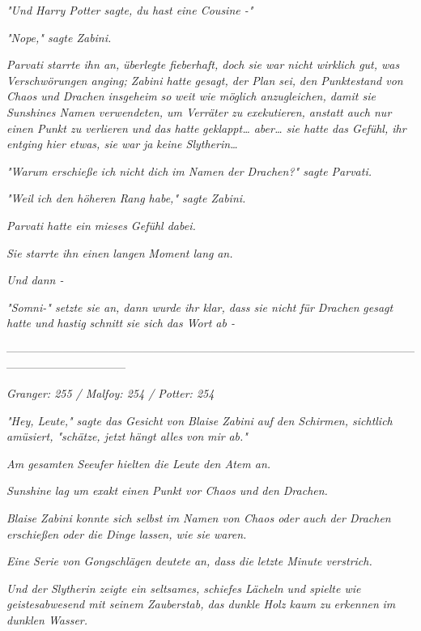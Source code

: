 {\emph{"Und Harry Potter sagte, du hast eine Cousine -"}

\emph{"Nope," sagte Zabini.}

\emph{Parvati starrte ihn an,} \emph{überlegte fieberhaft, doch sie war nicht wirklich gut, was Verschwörungen anging; Zabini hatte gesagt, der Plan sei,} \emph{den Punktestand von Chaos und Drachen insgeheim} \emph{so} \emph{weit wie möglich anzugleichen, damit sie Sunshines Namen verwendeten, um Verräter zu exekutieren, anstatt auch nur einen Punkt zu verlieren und das hatte} \emph{\emph{geklappt}… aber… sie hatte das Gefühl, ihr entging hier etwas, sie war} \emph{ja} \emph{keine Slytherin…}

\emph{"Warum erschieße} \emph{\emph{ich}} \emph{nicht} \emph{\emph{dich}} \emph{im Namen der Drachen?" sagte Parvati.}

\emph{"Weil ich den höheren Rang habe," sagte Zabini.}

\emph{Parvati hatte ein mieses Gefühl dabei.}

\emph{Sie starrte ihn einen langen} \emph{Moment lang} \emph{an.}

\emph{Und dann -}

\emph{"\emph{Somni-}" setzte sie an, dann wurde ihr klar, dass sie nicht} \emph{\emph{für Drachen}} \emph{gesagt hatte und} \emph{hastig} \emph{schnitt} \emph{sie sich} \emph{das Wort ab -}

--------------------------------------------------------------------------------------------------------------------------------------------

\emph{Granger: 255 / Malfoy: 254 / Potter: 254}

\emph{"Hey, Leute," sagte das Gesicht von Blaise Zabini auf den Schirmen, sichtlich amüsiert, "schätze, jetzt hängt alles} \emph{von} \emph{mir} \emph{ab."}

\emph{Am gesamten Seeufer hielten die Leute den Atem an.}

\emph{Sunshine lag um exakt einen Punkt vor Chaos und den Drachen.}

\emph{Blaise Zabini konnte sich selbst im Namen von Chaos oder auch der Drachen erschießen oder die Dinge lassen, wie sie waren.}

\emph{Eine Serie von Gongschlägen deutete an, dass die} \emph{letzte Minute verstrich.}

\emph{Und der Slytherin zeigte ein seltsames, schiefes Lächeln und spielte wie geistesabwesend mit seinem Zauberstab, das dunkle Holz kaum} \emph{zu} \emph{erkennen} \emph{im dunklen Wasser.}

}
